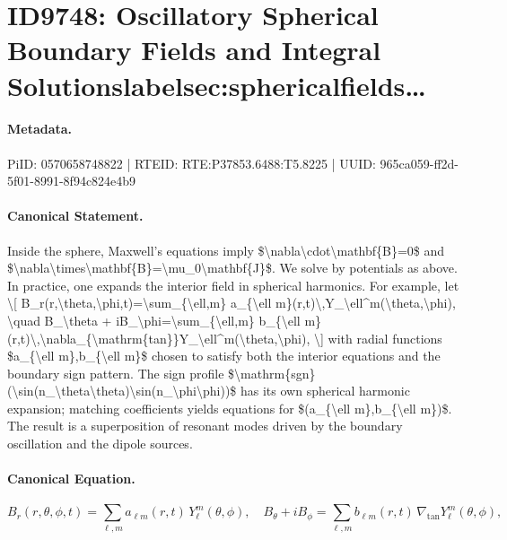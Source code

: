 \section*{ID9748: Oscillatory Spherical Boundary Fields and Integral Solutionslabelsec:sphericalfields…}
\paragraph{Metadata.}
PiID: 0570658748822 | RTEID: RTE:P37853.6488:T5.8225 | UUID: 965ca059-ff2d-5f01-8991-8f94c824e4b9

\paragraph{Canonical Statement.}
Inside the sphere, Maxwell's equations imply \$\textbackslash{}nabla\textbackslash{}cdot\textbackslash{}mathbf\{B\}=0\$ and \$\textbackslash{}nabla\textbackslash{}times\textbackslash{}mathbf\{B\}=\textbackslash{}mu\_0\textbackslash{}mathbf\{J\}\$. We solve by potentials as above. In practice, one expands the interior field in spherical harmonics. For example, let \textbackslash{}[ B\_r(r,\textbackslash{}theta,\textbackslash{}phi,t)=\textbackslash{}sum\_\{\textbackslash{}ell,m\} a\_\{\textbackslash{}ell m\}(r,t)\textbackslash{},Y\_\textbackslash{}ell\textasciicircum{}m(\textbackslash{}theta,\textbackslash{}phi), \textbackslash{}quad B\_\textbackslash{}theta + iB\_\textbackslash{}phi=\textbackslash{}sum\_\{\textbackslash{}ell,m\} b\_\{\textbackslash{}ell m\}(r,t)\textbackslash{},\textbackslash{}nabla\_\{\textbackslash{}mathrm\{tan\}\}Y\_\textbackslash{}ell\textasciicircum{}m(\textbackslash{}theta,\textbackslash{}phi), \textbackslash{}] with radial functions \$a\_\{\textbackslash{}ell m\},b\_\{\textbackslash{}ell m\}\$ chosen to satisfy both the interior equations and the boundary sign pattern. The sign profile \$\textbackslash{}mathrm\{sgn\}(\textbackslash{}sin(n\_\textbackslash{}theta\textbackslash{}theta)\textbackslash{}sin(n\_\textbackslash{}phi\textbackslash{}phi))\$ has its own spherical harmonic expansion; matching coefficients yields equations for \$(a\_\{\textbackslash{}ell m\},b\_\{\textbackslash{}ell m\})\$. The result is a superposition of resonant modes driven by the boundary oscillation and the dipole sources.

\paragraph{Canonical Equation.}
\[
B_r(r,\theta,\phi,t)=\sum_{\ell,m} a_{\ell m}(r,t)\,Y_\ell^m(\theta,\phi), \quad B_\theta + iB_\phi=\sum_{\ell,m} b_{\ell m}(r,t)\,\nabla_{\mathrm{tan}}Y_\ell^m(\theta,\phi),
\]

